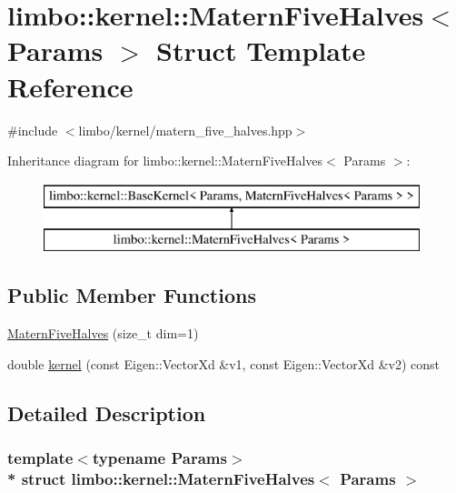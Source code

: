 \hypertarget{structlimbo_1_1kernel_1_1_matern_five_halves}{}\section{limbo\+:\+:kernel\+:\+:Matern\+Five\+Halves$<$ Params $>$ Struct Template Reference}
\label{structlimbo_1_1kernel_1_1_matern_five_halves}


{\ttfamily \#include $<$limbo/kernel/matern\+\_\+five\+\_\+halves.\+hpp$>$}

Inheritance diagram for limbo\+:\+:kernel\+:\+:Matern\+Five\+Halves$<$ Params $>$\+:\begin{figure}[H]
\begin{center}
\leavevmode
\includegraphics[height=2.000000cm]{structlimbo_1_1kernel_1_1_matern_five_halves}
\end{center}
\end{figure}
\subsection*{Public Member Functions}
\begin{DoxyCompactItemize}
\item 
\hyperlink{structlimbo_1_1kernel_1_1_matern_five_halves_ad574e55051fb4728271945cb46ea11f0}{Matern\+Five\+Halves} (size\+\_\+t dim=1)
\item 
double \hyperlink{structlimbo_1_1kernel_1_1_matern_five_halves_a1cf740c6bd0ec87fdae0ede9d097dfc7}{kernel} (const Eigen\+::\+Vector\+Xd \&v1, const Eigen\+::\+Vector\+Xd \&v2) const 
\end{DoxyCompactItemize}


\subsection{Detailed Description}
\subsubsection*{template$<$typename Params$>$\\*
struct limbo\+::kernel\+::\+Matern\+Five\+Halves$<$ Params $>$}

